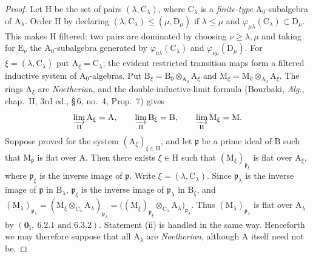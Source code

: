 \begin{proof}
Let $\mathrm{H}$ be the set of pairs $(\lambda,\mathrm{C}_\lambda)$,
where $\mathrm{C}_\lambda$ is a \emph{finite-type}
$\mathrm{A}_0$-subalgebra of $\mathrm{A}_\lambda$. Order $\mathrm{H}$ by
declaring $(\lambda,\mathrm{C}_\lambda)\leqslant
(\mu,\mathrm{D}_\mu)$ if $\lambda\leqslant\mu$ and
$\varphi_{\mu\lambda}(\mathrm{C}_\lambda)\subset\mathrm{D}_\mu$.
This makes $\mathrm{H}$ filtered: two pairs are dominated by choosing
$\nu\geqslant\lambda,\mu$ and taking for $\mathrm{E}_\nu$ the
$\mathrm{A}_0$-subalgebra generated by
$\varphi_{\nu\lambda}(\mathrm{C}_\lambda)$ and
$\varphi_{\nu\mu}(\mathrm{D}_\mu)$. For
$\xi=(\lambda,\mathrm{C}_\lambda)$ put
$\mathrm{A}_\xi=\mathrm{C}_\lambda$; the evident restricted transition
maps form a filtered inductive system of $\mathrm{A}_0$-algebras.
Put
$\mathrm{B}_\xi=\mathrm{B}_0\otimes_{\mathrm{A}_0}\mathrm{A}_\xi$
and
$\mathrm{M}_\xi=\mathrm{M}_0\otimes_{\mathrm{A}_0}\mathrm{A}_\xi$.
The rings $\mathrm{A}_\xi$ are \emph{Noetherian}, and the double-inductive-limit
formula (Bourbaki, \emph{Alg.}, chap.~II, 3rd ed., \S\,6, no.~4,
Prop.~7) gives
\[
  \varinjlim_{\mathrm H}\mathrm{A}_\xi=\mathrm{A},\qquad
  \varinjlim_{\mathrm H}\mathrm{B}_\xi=\mathrm{B},\qquad
  \varinjlim_{\mathrm H}\mathrm{M}_\xi=\mathrm{M}.
\]
Suppose  proved for the system
$(\mathrm{A}_\xi)_{\xi\in\mathrm H}$, and let $\mathfrak p$ be a prime
ideal of $\mathrm B$ such that $\mathrm M_{\mathfrak p}$ is flat over
$\mathrm A$. Then there exists $\xi\in\mathrm H$ such that
$(\mathrm{M}_\xi)_{\mathfrak{p}_\xi}$ is flat over
$\mathrm{A}_\xi$, where $\mathfrak p_\xi$ is the inverse image of
$\mathfrak p$. Write $\xi=(\lambda,\mathrm{C}_\lambda)$. Since
$\mathfrak{p}_\lambda$ is the inverse image of $\mathfrak p$ in
$\mathrm{B}_\lambda$, $\mathfrak p_\xi$ is the inverse image of
$\mathfrak p_\lambda$ in $\mathrm B_\xi$, and $(\mathrm{M}_\lambda)_{\mathfrak p_\lambda}
=(\mathrm{M}_\xi\otimes_{\mathrm{C}_\lambda}
\mathrm{A}_\lambda)_{\mathfrak p_\lambda}
=\bigl((\mathrm{M}_\xi)_{\mathfrak p_\xi}
\otimes_{\mathrm{C}_\lambda}\mathrm{A}_\lambda
\bigr)_{\mathfrak p_\lambda}$.
Thus $(\mathrm{M}_\lambda)_{\mathfrak p_\lambda}$ is flat over
$\mathrm{A}_\lambda$ by
$(\mathbf{0}_\mathrm{I},~6.2.1\text{ and }6.3.2)$. Statement (ii) is
handled in the same way. Henceforth we may therefore suppose that all
$\mathrm{A}_\lambda$ are \emph{Noetherian}, although $\mathrm A$ itself need
not be.


\end{proof}
